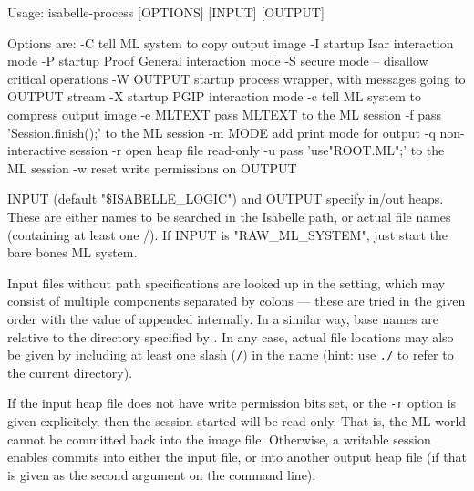 \begin{isabellebody}
\begin{isamarkuptext}
\begin{ttbox}
Usage: isabelle-process [OPTIONS] [INPUT] [OUTPUT]

  Options are:
    -C           tell ML system to copy output image
    -I           startup Isar interaction mode
    -P           startup Proof General interaction mode
    -S           secure mode -- disallow critical operations
    -W OUTPUT    startup process wrapper, with messages going to OUTPUT stream
    -X           startup PGIP interaction mode
    -c           tell ML system to compress output image
    -e MLTEXT    pass MLTEXT to the ML session
    -f           pass 'Session.finish();' to the ML session
    -m MODE      add print mode for output
    -q           non-interactive session
    -r           open heap file read-only
    -u           pass 'use"ROOT.ML";' to the ML session
    -w           reset write permissions on OUTPUT

  INPUT (default "\$ISABELLE_LOGIC") and OUTPUT specify in/out heaps.
  These are either names to be searched in the Isabelle path, or
  actual file names (containing at least one /).
  If INPUT is "RAW_ML_SYSTEM", just start the bare bones ML system.
\end{ttbox}

  Input files without path specifications are looked up in the
  \hyperlink{setting.ISABELLE-PATH}{\mbox{}} setting, which may consist of multiple
  components separated by colons --- these are tried in the given
  order with the value of \hyperlink{setting.ML-IDENTIFIER}{\mbox{}} appended
  internally.  In a similar way, base names are relative to the
  directory specified by \hyperlink{setting.ISABELLE-OUTPUT}{\mbox{}}.  In any case,
  actual file locations may also be given by including at least one
  slash (\verb|/|) in the name (hint: use \verb|./| to
  refer to the current directory).%
\end{isamarkuptext}%
\isamarkuptrue%
%
\isamarkuptrue%
%
\begin{isamarkuptext}%
If the input heap file does not have write permission bits set, or
  the \verb|-r| option is given explicitely, then the session
  started will be read-only.  That is, the ML world cannot be
  committed back into the image file.  Otherwise, a writable session
  enables commits into either the input file, or into another output
  heap file (if that is given as the second argument on the command
  line).


\end{isamarkuptext}
\end{isabellebody}
